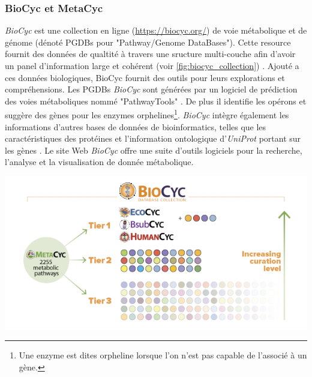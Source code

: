 \begin{refsegment}
    \subsubsection{BioCyc et MetaCyc}
    
    \textit{BioCyc} \cite{caspi2006metacyc,caspi2007metacyc,caspi2008metacyc,caspi2010metacyc,caspi2012metacyc,caspi2013metacyc,caspi2014metacyc,caspi2015metacyc,caspi2016metacyc} est une collection en ligne (\url{https://biocyc.org/}) de voie métabolique et de génome (dénoté PGDBs pour "Pathway/Genome DataBases"). Cette resource fournit des données de qualtité à travers une sructure multi-couche afin d'avoir un panel d'information large et cohérent (voir \cref{fig:biocyc_collection}) . Ajouté a ces données biologiques, BioCyc fournit des outils pour leurs explorations et compréhensions. Les PGDBs \textit{BioCyc} sont générées par un logiciel de prédiction des voies métaboliques nommé "PathwayTools" \cite{karpe2011pathway,karp2015pathway}. De plus il identifie les opérons \cite{romero2004using} et suggère des gènes pour les enzymes orphelines\footnote{Une enzyme est dites orpheline lorsque l'on n'est pas capable de l'associé à un gène.}\cite{Green2004}. \textit{BioCyc} intègre également les informations d'autres bases de données de bioinformatics, telles que les caractéristiques des protéines et l'information ontologique d'\textit{UniProt} portant sur les gènes . Le site Web \textit{BioCyc} offre une suite d'outils logiciels pour la recherche, l'analyse et la visualisation de donnée métabolique.
    
    
    \begin{shadedfigure}[H]
    	\centering
    	\includegraphics[width=\textwidth]{img/BioCycCollection.png}
    	\caption{\textit{BioCyc} est un ensemble de base de donnée et d'outil sur le métabolisme. \textit{Metacyc} regroupe l'ensemble des informations du monde vivant. Cette ressource comprend 2255 voies métaboliques à ce jour. Ces données biologiques sont répartis à travers 3 couches (i.e "Tiers"). Ces couches classifient le niveau de qualité des bases de données  (Du moins vers le plus qualitatif : tiers 3 à 1). \hspace{\textwidth} Source : \url{https://biocyc.org/}    }
    	\label{fig:biocyc_collection}
    \end{shadedfigure}
    

\end{refsegment}
